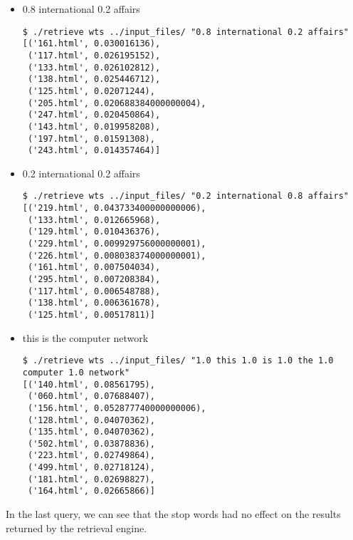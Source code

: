 \documentclass[paper=a4, fontsize=11pt]{scrartcl}
\numberwithin{equation}{section}		%
\numberwithin{figure}{section}			%
\numberwithin{table}{section}				%
\begin{document}
\begin{itemize}
\begin{verbatim}
\end{verbatim}

\item 0.8 international 0.2 affairs

\begin{verbatim}
$ ./retrieve wts ../input_files/ "0.8 international 0.2 affairs"
[('161.html', 0.030016136),
 ('117.html', 0.026195152),
 ('133.html', 0.026102812),
 ('138.html', 0.025446712),
 ('125.html', 0.02071244),
 ('205.html', 0.020688384000000004),
 ('247.html', 0.020450864),
 ('143.html', 0.019958208),
 ('197.html', 0.01591308),
 ('243.html', 0.014357464)]

\end{verbatim}

\item 0.2 international 0.2 affairs

\begin{verbatim}
$ ./retrieve wts ../input_files/ "0.2 international 0.8 affairs"
[('219.html', 0.043733400000000006),
 ('133.html', 0.012665968),
 ('129.html', 0.010436376),
 ('229.html', 0.009929756000000001),
 ('226.html', 0.008038374000000001),
 ('161.html', 0.007504034),
 ('295.html', 0.007208384),
 ('117.html', 0.006548788),
 ('138.html', 0.006361678),
 ('125.html', 0.00517811)]
\end{verbatim}

\item this is the computer network

\begin{verbatim}
$ ./retrieve wts ../input_files/ "1.0 this 1.0 is 1.0 the 1.0 computer 1.0 network"
[('140.html', 0.08561795),
 ('060.html', 0.07688407),
 ('156.html', 0.052877740000000006),
 ('128.html', 0.04070362),
 ('135.html', 0.04070362),
 ('502.html', 0.03878836),
 ('223.html', 0.02749864),
 ('499.html', 0.02718124),
 ('181.html', 0.02698827),
 ('164.html', 0.02665866)]
\end{verbatim}

\end{itemize}

In the last query, we can see that the stop words had no effect on the results returned by the retrieval engine.

\end{document}
